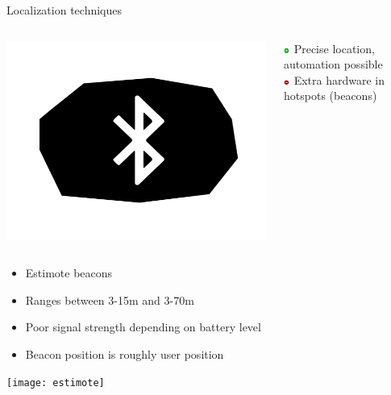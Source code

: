 \documentclass[11pt]{beamer}
\begin{document}
\begin{frame}[t]{Localization techniques}

  \begin{columns}[c]

    \begin{column}{0.2\textwidth}
      \includegraphics[width=\textwidth]{beacon-symbol}
    \end{column}

    \hfill

    \begin{column}{0.8\textwidth}

      \includegraphics[width=0.05\textwidth]{plus} Precise location, automation possible\\
      \includegraphics[width=0.05\textwidth]{minus} Extra hardware in hotspots (beacons)

    \end{column}

  \end{columns}

  \begin{itemize}
    \setlength{\itemsep}{1pt}
    \setlength{\parskip}{0pt}
    \setlength{\parsep}{0pt}
    \item Estimote beacons
    \item Ranges between 3-15m and 3-70m
    \item Poor signal strength depending on battery level
    \item Beacon position is roughly user position
  \end{itemize}
  \begin{center}
    \texttt{[image: estimote]}
  \end{center}
\end{frame}
\end{document}
